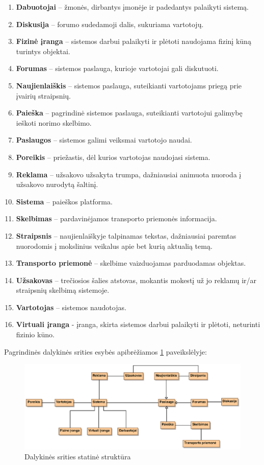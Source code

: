 \documentclass[12pt]{article}
\begin{document}
	\begin{enumerate}
		\item{\textbf{Dabuotojai} – žmonės, dirbantys įmonėje ir padedantys palaikyti sistemą.}
		\item{\textbf{Diskusija} – forumo sudedamoji dalis, sukuriama vartotojų.}
		\item{\textbf{Fizinė įranga} – sistemos darbui palaikyti ir plėtoti naudojama fizinį kūną turintys objektai.}
		\item{\textbf{Forumas} – sistemos paslauga, kurioje vartotojai gali diskutuoti.}
		\item{\textbf{Naujienlaiškis} – sistemos paslauga, suteikianti vartotojams priegą prie įvairių straipsnių.}
		\item{\textbf{Paieška} – pagrindinė sistemos paslauga, suteikianti vartotojui galimybę ieškoti norimo skelbimo.}
		\item{\textbf{Paslaugos} – sistemos galimi veiksmai vartotojo naudai.}
		\item{\textbf{Poreikis} – priežastis, dėl kurios vartotojas naudojasi sistema.}
		\item{\textbf{Reklama} – užsakovo užsakyta trumpa, dažniausiai animuota nuoroda į užsakovo nurodytą šaltinį.}
		\item{\textbf{Sistema} – paieškos platforma.}
		\item{\textbf{Skelbimas} – pardavinėjamos transporto priemonės informacija.}
		\item{\textbf{Straipsnis} – naujienlaiškyje talpinamas tekstas, dažniausiai paremtas nuorodomis į mokslinius veikalus apie bet kurią aktualią temą.}
		\item{\textbf{Transporto priemonė} – skelbime vaizduojamas parduodamas objektas.}
		\item{\textbf{Užsakovas} – trečiosios šalies atstovas, mokantis mokestį už jo reklamų ir/ar straipsnių skelbimą sistemoje.}
		\item{\textbf{Vartotojas} – sistemos naudotojas.}
		\item{\textbf{Virtuali įranga} -  įranga, skirta sistemos darbui palaikyti ir plėtoti, neturinti fizinio kūno.}
	\end{enumerate}
	
	Pagrindinės dalykinės srities esybės apibrėžiamos \ref{StaticStruct} paveikslėlyje:
	
	\begin{figure}[h]
		\begin{center}
			\includegraphics[width=\textwidth]{StatineSchema.eps}
			\caption{Dalykinės srities statinė struktūra\label{StaticStruct}}
		\end{center}
	\end{figure}
\end{document}
